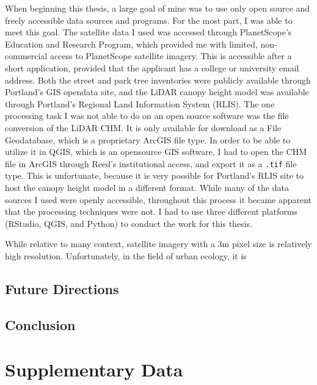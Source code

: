 \documentclass[12pt,twoside]{reedthesis}
\begin{document}
When beginning this thesis, a large goal of mine was to use only open
source and freely accessible data sources and programs. For the most
part, I was able to meet this goal. The satellite data I used was
accessed through PlanetScope's Education and Research Program, which
provided me with limited, non-commercial access to PlanetScope satellite
imagery. This is accessible after a short application, provided that the
applicant has a college or university email address. Both the street and
park tree inventories were publicly available through Portland's GIS
opendata site, and the LiDAR canopy height model was available through
Portland's Regional Land Information System (RLIS). The one processing
task I was not able to do on an open source software was the file
conversion of the LiDAR CHM. It is only available for download as a File
Geodatabase, which is a proprietary ArcGIS file type. In order to be
able to utilize it in QGIS, which is an opensource GIS software, I had
to open the CHM file in ArcGIS through Reed's institutional access, and
export it as a \texttt{.tif} file type. This is unfortunate, because it is very
possible for Portland's RLIS site to host the canopy height model in a
different format. While many of the data sources I used were openly
accessible, throughout this process it became apparent that the
processing techniques were not. I had to use three different platforms
(RStudio, QGIS, and Python) to conduct the work for this thesis.

While relative to many context, satellite imagery with a 3m pixel size
is relatively high resolution. Unfortunately, in the field of urban
ecology, it is

\hypertarget{future-directions}{%
\section{Future Directions}\label{future-directions}}

\hypertarget{conclusion}{%
\section{Conclusion}\label{conclusion}}

\appendix

\hypertarget{data}{%
\chapter{Supplementary Data}\label{data}}
\end{document}
